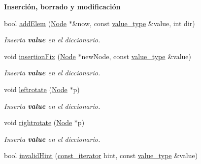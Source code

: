 \begin{Indent}\textbf{ Inserción, borrado y modificación}\par
\begin{DoxyCompactItemize}
\item 
bool \hyperlink{classaed2_1_1map_a709e1a06ac3c5932c1eb6d9741f37b2c_a709e1a06ac3c5932c1eb6d9741f37b2c}{add\+Elem} (\hyperlink{structaed2_1_1map_1_1Node}{Node} $\ast$\&now, const \hyperlink{classaed2_1_1map_a719db98e0ff9a837610f76be33264680_a719db98e0ff9a837610f76be33264680}{value\+\_\+type} \&value, int dir)
\begin{DoxyCompactList}\small\item\em Inserta {\bfseries value} en el diccionario. \end{DoxyCompactList}\item 
void \hyperlink{classaed2_1_1map_abe3f47a745e17a6327943b813ff6bfb3_abe3f47a745e17a6327943b813ff6bfb3}{insertion\+Fix} (\hyperlink{structaed2_1_1map_1_1Node}{Node} $\ast$new\+Node, const \hyperlink{classaed2_1_1map_a719db98e0ff9a837610f76be33264680_a719db98e0ff9a837610f76be33264680}{value\+\_\+type} \&value)
\begin{DoxyCompactList}\small\item\em Inserta {\bfseries value} en el diccionario. \end{DoxyCompactList}\item 
void \hyperlink{classaed2_1_1map_ad764851f1534f2db0964c4f729056a1e_ad764851f1534f2db0964c4f729056a1e}{leftrotate} (\hyperlink{structaed2_1_1map_1_1Node}{Node} $\ast$p)
\begin{DoxyCompactList}\small\item\em Inserta {\bfseries value} en el diccionario. \end{DoxyCompactList}\item 
void \hyperlink{classaed2_1_1map_a816d69fa4dfe18a984dc3628fee14e2f_a816d69fa4dfe18a984dc3628fee14e2f}{rightrotate} (\hyperlink{structaed2_1_1map_1_1Node}{Node} $\ast$p)
\begin{DoxyCompactList}\small\item\em Inserta {\bfseries value} en el diccionario. \end{DoxyCompactList}\item 
bool \hyperlink{classaed2_1_1map_a7403745a296985d64b8666c18953b2c0_a7403745a296985d64b8666c18953b2c0}{invalid\+Hint} (\hyperlink{classaed2_1_1map_1_1const__iterator}{const\+\_\+iterator} hint, const \hyperlink{classaed2_1_1map_a719db98e0ff9a837610f76be33264680_a719db98e0ff9a837610f76be33264680}{value\+\_\+type} \&value)

\end{DoxyCompactItemize}
\end{Indent}

